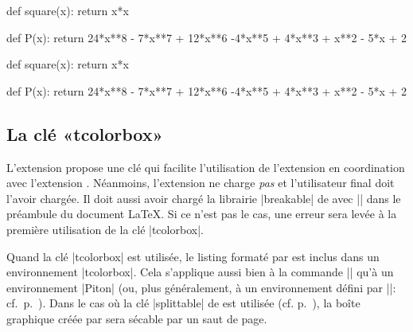 \documentclass[dvipsnames,svgnames]{article}
\begin{document}
\begin{Code}
\begin{center}
\begin{Piton}
def square(x):
    return x*x
\end{Piton}
\hspace{1cm}
\begin{Piton}
def P(x):
    return 24*x**8 - 7*x**7 + 12*x**6 -4*x**5 + 4*x**3 + x**2 - 5*x + 2
\end{Piton}
\end{center}
\end{Code}

\begin{center}
\begin{Piton}
def square(x):
    return x*x
\end{Piton}
\hspace{1cm}
\begin{Piton}
def P(x):
    return 24*x**8 - 7*x**7 + 12*x**6 -4*x**5 + 4*x**3 + x**2 - 5*x + 2
\end{Piton}
\end{center}


\subsection{La clé «tcolorbox»}

\label{tcolorbox}

L'extension  propose une clé  qui facilite
l'utilisation de l'extension  en coordination avec l'extension
. Néanmoins, l'extension  ne charge \emph{pas} 
et l'utilisateur final doit l'avoir chargée. Il doit aussi avoir chargé la
librairie |breakable| de  avec || dans le
préambule du document LaTeX. Si ce n'est pas le cas, une erreur sera levée à la première
utilisation de la clé |tcolorbox|.


\bigskip
Quand la clé |tcolorbox| est utilisée, le listing formaté par  est
inclus dans un environnement |{tcolorbox}|. Cela s'applique aussi bien à la
commande |\PitonInputFile| qu'à un environnement |{Piton}| (ou, plus
généralement, à un environnement défini par |\NewPitonEnvironment|:
cf.~p.~\pageref{NewPitonEnvironment}). Dans le cas où la clé |splittable| de
 est utilisée (cf. p.~\pageref{coupure-de-pages}), la boîte graphique
créée par  sera sécable par un saut de page.
\end{document}
